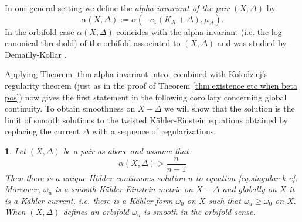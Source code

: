 \documentclass[11pt,oneside,english]{amsart}
\numberwithin{equation}{section}
\numberwithin{figure}{section}
\theoremstyle{plain}
\theoremstyle{plain}
\newtheorem{cor}[thm]{\protect\corollaryname}
\theoremstyle{plain}
\theoremstyle{plain}
\theoremstyle{remark}
\theoremstyle{definition}
\providecommand{\corollaryname}{Corollary}
\begin{document}
In our general setting we define the\emph{ alpha-invariant of the
pair $(X,\Delta)$} by 
\[
\alpha(X,\Delta):=\alpha(-c_{1}(K_{X}+\Delta),\mu_{\Delta}).
\]
 In the orbifold case $\alpha(X,\Delta)$ coincides with the alpha-invariant
(i.e. the log canonical threshold) of the orbifold associated to $(X,\Delta)$
and was studied by Demailly-Kollar \cite{d-j}.

Applying Theorem \ref{thm:alpha invariant intro} combined with Kolodziej's
regularity theorem (just as in the proof of Theorem \ref{thm:existence etc when beta pos})
now gives the first statement in the following corollary concerning
global continuity. To obtain smoothness on $X-\Delta$ we will show
that the solution is the limit of smooth solutions to the twisted
Kähler-Einstein equations obtained by replacing the current $\Delta$
with a sequence of regularizations. 
\begin{cor}
\label{cor:alpha for pairs gives ec}Let $(X,\Delta)$ be a pair as
above and assume that 
\begin{equation}
\alpha(X,\Delta)>\frac{n}{n+1}\label{eq:alpha in statement cor alp pair}
\end{equation}
 Then there is a unique Hölder continuous solution $u$ to equation
\ref{eq:singular k-e}. \textup{\emph{Moreover, $\omega_{u}$ is a
smooth Kähler-Einstein metric on $X-\Delta$ and globally on $X$
it is a Kähler current, i.e. there is a Kähler form $\omega_{0}$
on $X$ such that $\omega_{u}\geq\omega_{0}$ on $X.$ When $(X,\Delta)$
defines an orbifold $\omega_{u}$ is smooth in the orbifold sense.}}\emph{ }\end{cor}
\end{document}
